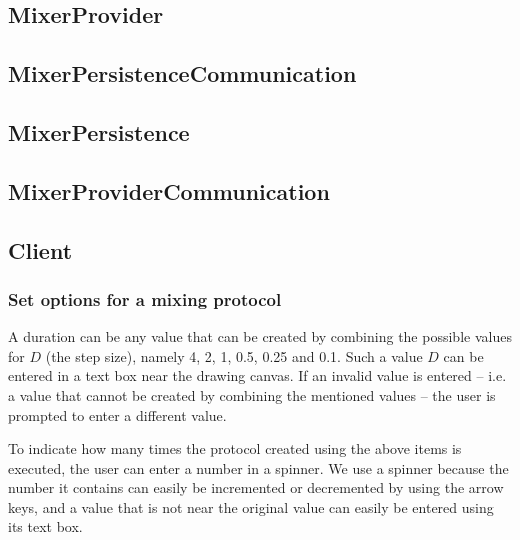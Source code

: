 \subsection{MixerProvider}

\subsection{MixerPersistenceCommunication}

\subsection{MixerPersistence}

\subsection{MixerProviderCommunication}

\subsection{Client}
\subsubsection{Set options for a mixing protocol}
A duration can be any value that can be created by combining the possible values for $D$ (the step size), namely 4, 2, 1, 0.5, 0.25 and 0.1. Such a value $D$ can be entered in a text box near the drawing canvas. If an invalid value is entered -- i.e. a value that cannot be created by combining the mentioned values -- the user is prompted to enter a different value.

To indicate how many times the protocol created using the above items is executed, the user can enter a number in a spinner. We use a spinner because the number it contains can easily be incremented or decremented by using the arrow keys, and a value that is not near the original value can easily be entered using its text box.



